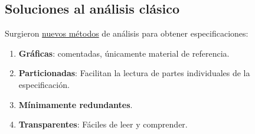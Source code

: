 \subsection{Soluciones al análisis clásico}
Surgieron \uline{nuevos métodos} de análisis para obtener especificaciones:

\begin{enumerate}
    \item \textbf{Gráficas}: comentadas, únicamente material de referencia. %
    \item \textbf{Particionadas}: Facilitan la lectura de partes individuales de la especificación.
    \item \textbf{Mínimamente redundantes}.
    \item \textbf{Transparentes}: Fáciles de leer y comprender. %
\end{enumerate}


